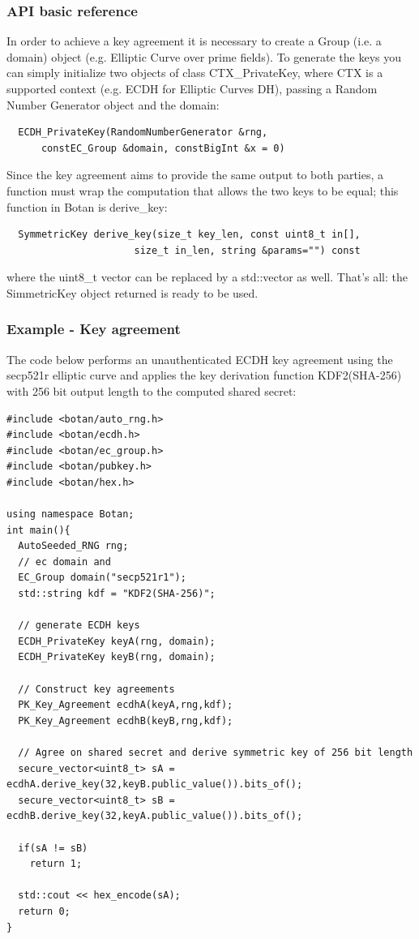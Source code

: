 \subsubsection*{API basic reference}
In order to achieve a key agreement it is necessary to create a Group (i.e. a domain) object (e.g. Elliptic Curve over prime fields). To generate the keys you can simply initialize two objects of class CTX\_PrivateKey, where CTX is a supported context (e.g. ECDH for Elliptic Curves DH), passing a Random Number Generator object and the domain:
\begin{verbatim}
  ECDH_PrivateKey(RandomNumberGenerator &rng,
      constEC_Group &domain, constBigInt &x = 0)
\end{verbatim}
Since the key agreement aims to provide the same output to both parties, a function must wrap the computation that allows the two keys to be equal; this function in Botan is derive\_key:
\begin{verbatim}
  SymmetricKey derive_key(size_t key_len, const uint8_t in[],
                      size_t in_len, string &params="") const
\end{verbatim}
where the uint8\_t vector can be replaced by a std::vector as well. That's all: the SimmetricKey object returned is ready to be used.

\subsubsection*{Example - Key agreement}
The code below performs an unauthenticated ECDH key agreement using the secp521r elliptic curve and applies the key derivation function KDF2(SHA-256) with 256 bit output length to the computed shared secret:
\begin{verbatim}
#include <botan/auto_rng.h>
#include <botan/ecdh.h>
#include <botan/ec_group.h>
#include <botan/pubkey.h>
#include <botan/hex.h>

using namespace Botan;
int main(){
  AutoSeeded_RNG rng;
  // ec domain and
  EC_Group domain("secp521r1");
  std::string kdf = "KDF2(SHA-256)";
  
  // generate ECDH keys
  ECDH_PrivateKey keyA(rng, domain);
  ECDH_PrivateKey keyB(rng, domain);
  
  // Construct key agreements
  PK_Key_Agreement ecdhA(keyA,rng,kdf);
  PK_Key_Agreement ecdhB(keyB,rng,kdf);
  
  // Agree on shared secret and derive symmetric key of 256 bit length
  secure_vector<uint8_t> sA = ecdhA.derive_key(32,keyB.public_value()).bits_of();
  secure_vector<uint8_t> sB = ecdhB.derive_key(32,keyA.public_value()).bits_of();
  
  if(sA != sB)
    return 1;

  std::cout << hex_encode(sA);
  return 0;
}
\end{verbatim}

